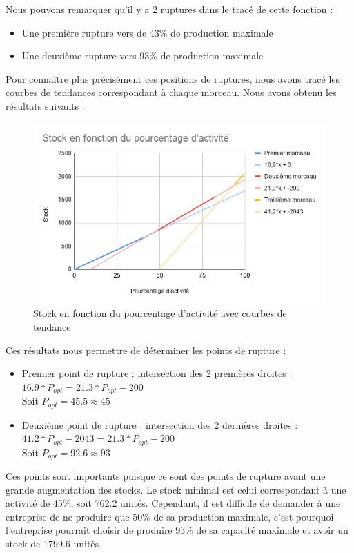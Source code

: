 \documentclass{article}
\begin{document}
Nous pouvons remarquer qu'il y a 2 ruptures dans le tracé de cette fonction : 
\begin{itemize}
\item Une première rupture vers de 43\% de production maximale
\item Une deuxième rupture vers 93\% de production maximale
\end{itemize}

Pour connaître plus précisément ces positions de ruptures, nous avons tracé les courbes de tendances correspondant à chaque morceau. Nous avons obtenu les résultats suivants :

\begin{center}
\begin{figure}[H]
\includegraphics[width=1\textwidth]{img/Stock_Activite_tendance}
\caption{Stock en fonction du pourcentage d'activité avec courbes de tendance}
\end{figure}
\end{center}

Ces résultats nous permettre de déterminer les points de rupture :
\begin{itemize}
\item Premier point de rupture : intersection des 2 premières droites :\\
$16.9*P_{opt} = 21.3*P_{opt} - 200$ \\
Soit $P_{opt} = 45.5 \approx 45 $
\item Deuxième point de rupture : intersection des 2 dernières droites :\\
$41.2*P_{opt}-2043 = 21.3*P_{opt} - 200$ \\
Soit $P_{opt} = 92.6 \approx 93 $
\end{itemize}

Ces points sont importants puisque ce sont des points de rupture avant une grande augmentation des stocks. Le stock minimal est celui correspondant à une activité de 45\%, soit 762.2 unités. Cependant, il est difficile de demander à une entreprise de ne produire que 50\% de sa production maximale, c'est pourquoi l'entreprise pourrait choisir de produire 93\% de sa capacité maximale et avoir un stock de 1799.6 unités. 
\end{document}
